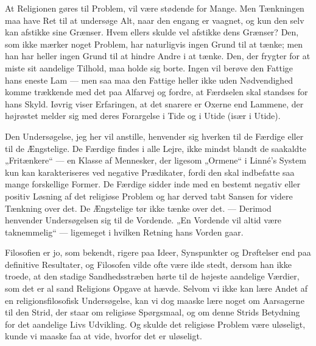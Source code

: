 \documentclass[12pt,a4paper,openany]{book}
\newcommand{\opage}[1]{\marginnote{\footnotesize\textit{[#1]}}}
\begin{document}
At Religionen gøres til Problem, vil være stødende for Mange. Men
Tænkningen maa have Ret til at undersøge Alt, naar den engang er
vaagnet, og kun den selv kan afstikke sine Grænser. Hvem ellers skulde
vel afstikke dens Grænser? Den, som ikke mærker noget Problem, har
naturligvis ingen Grund til at tænke; men han har heller ingen Grund til
at hindre Andre i at tænke. Den, der frygter for at miste sit aandelige
Tilhold, maa holde sig borte. Ingen vil berøve den Fattige hans eneste
Lam --- men saa maa den Fattige heller ikke uden Nødvendighed komme
trækkende med det paa Alfarvej og fordre, at Færdselen skal standses for
hans Skyld. Iøvrig viser Erfaringen, at det snarere er Oxerne end
Lammene, der højrøstet melder sig med deres Forargelse i Tide og i Utide
(især i Utide).

Den Undersøgelse, jeg her vil anstille, henvender sig hverken til de
Færdige eller til de Ængstelige. De Færdige findes i alle Lejre, ikke
mindst blandt de saakaldte „Fritænkere“ --- en Klasse af Mennesker, der
ligesom „Ormene“ i Linné’s System kun kan karakteriseres ved negative
Prædikater, fordi den skal indbefatte saa mange forskellige Former. De
Færdige sidder inde med en bestemt negativ eller positiv Løsning af det
religiøse Problem og har derved tabt Sansen for videre Tænkning over
det. De Ængstelige tør ikke tænke over det. --- Derimod henvender
Undersøgelsen sig
\opage{5}til de Vordende. „En Vordende vil altid være taknemmelig“ ---
ligemeget i hvilken Retning hans Vorden gaar.

Filosofien er jo, som bekendt, rigere paa Ideer, Synspunkter og
Drøftelser end paa definitive Resultater, og Filosofen vilde ofte være
ilde stedt, dersom han ikke troede, at den stadige Sandhedsstræben hørte
til de højeste aandelige Værdier, som det er al sand Religions Opgave at
hævde. Selvom vi ikke kan lære Andet af en religionsfilosofisk
Undersøgelse, kan vi dog maaske lære noget om Aarsagerne til den Strid,
der staar om religiøse Spørgsmaal, og om denne Strids Betydning for det
aandelige Livs Udvikling. Og skulde det religiøse Problem være
uløseligt, kunde vi maaske faa at vide, hvorfor det er uløseligt.
\end{document}
